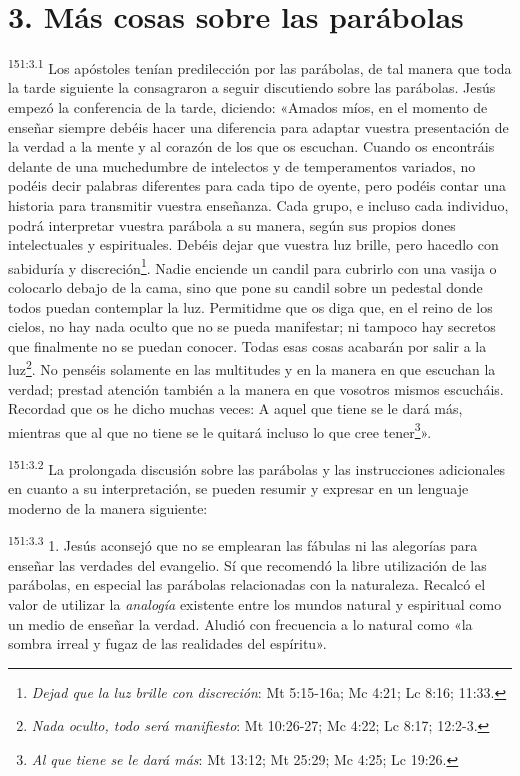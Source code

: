 \section*{3. Más cosas sobre las parábolas}
\par 
\textsuperscript{151:3.1} Los apóstoles tenían predilección por las parábolas, de tal manera que toda la tarde siguiente la consagraron a seguir discutiendo sobre las parábolas. Jesús empezó la conferencia de la tarde, diciendo: «Amados míos, en el momento de enseñar siempre debéis hacer una diferencia para adaptar vuestra presentación de la verdad a la mente y al corazón de los que os escuchan. Cuando os encontráis delante de una muchedumbre de intelectos y de temperamentos variados, no podéis decir palabras diferentes para cada tipo de oyente, pero podéis contar una historia para transmitir vuestra enseñanza. Cada grupo, e incluso cada individuo, podrá interpretar vuestra parábola a su manera, según sus propios dones intelectuales y espirituales. Debéis dejar que vuestra luz brille, pero hacedlo con sabiduría y discreción\footnote{\textit{Dejad que la luz brille con discreción}: Mt 5:15-16a; Mc 4:21; Lc 8:16; 11:33.}. Nadie enciende un candil para cubrirlo con una vasija o colocarlo debajo de la cama, sino que pone su candil sobre un pedestal donde todos puedan contemplar la luz. Permitidme que os diga que, en el reino de los cielos, no hay nada oculto que no se pueda manifestar; ni tampoco hay secretos que finalmente no se puedan conocer. Todas esas cosas acabarán por salir a la luz\footnote{\textit{Nada oculto, todo será manifiesto}: Mt 10:26-27; Mc 4:22; Lc 8:17; 12:2-3.}. No penséis solamente en las multitudes y en la manera en que escuchan la verdad; prestad atención también a la manera en que vosotros mismos escucháis. Recordad que os he dicho muchas veces: A aquel que tiene se le dará más, mientras que al que no tiene se le quitará incluso lo que cree tener\footnote{\textit{Al que tiene se le dará más}: Mt 13:12; Mt 25:29; Mc 4:25; Lc 19:26.}».

\par 
\textsuperscript{151:3.2} La prolongada discusión sobre las parábolas y las instrucciones adicionales en cuanto a su interpretación, se pueden resumir y expresar en un lenguaje moderno de la manera siguiente:

\par 
\textsuperscript{151:3.3} 1. Jesús aconsejó que no se emplearan las fábulas ni las alegorías para enseñar las verdades del evangelio. Sí que recomendó la libre utilización de las parábolas, en especial las parábolas relacionadas con la naturaleza. Recalcó el valor de utilizar la \textit{analogía} existente entre los mundos natural y espiritual como un medio de enseñar la verdad. Aludió con frecuencia a lo natural como «la sombra irreal y fugaz de las realidades del espíritu».

